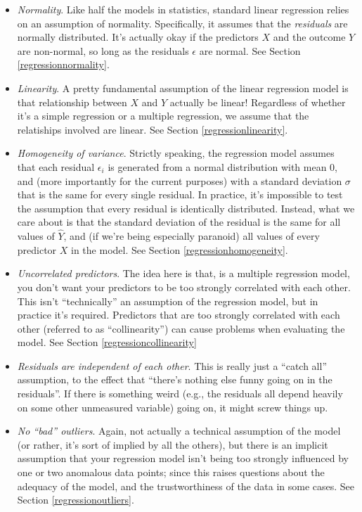 \documentclass[
]{book}
\providecommand{\tightlist}{%
  \setlength{\itemsep}{0pt}\setlength{\parskip}{0pt}}
\begin{document}
\begin{itemize}
\tightlist
\item
  \emph{Normality}. Like half the models in statistics, standard linear regression relies on an assumption of normality. Specifically, it assumes that the \emph{residuals} are normally distributed. It's actually okay if the predictors \(X\) and the outcome \(Y\) are non-normal, so long as the residuals \(\epsilon\) are normal. See Section \ref{regressionnormality}.
\item
  \emph{Linearity}. A pretty fundamental assumption of the linear regression model is that relationship between \(X\) and \(Y\) actually be linear! Regardless of whether it's a simple regression or a multiple regression, we assume that the relatiships involved are linear. See Section \ref{regressionlinearity}.
\item
  \emph{Homogeneity of variance}. Strictly speaking, the regression model assumes that each residual \(\epsilon_i\) is generated from a normal distribution with mean 0, and (more importantly for the current purposes) with a standard deviation \(\sigma\) that is the same for every single residual. In practice, it's impossible to test the assumption that every residual is identically distributed. Instead, what we care about is that the standard deviation of the residual is the same for all values of \(\hat{Y}\), and (if we're being especially paranoid) all values of every predictor \(X\) in the model. See Section \ref{regressionhomogeneity}.
\item
  \emph{Uncorrelated predictors}. The idea here is that, is a multiple regression model, you don't want your predictors to be too strongly correlated with each other. This isn't ``technically'' an assumption of the regression model, but in practice it's required. Predictors that are too strongly correlated with each other (referred to as ``collinearity'') can cause problems when evaluating the model. See Section \ref{regressioncollinearity}
\item
  \emph{Residuals are independent of each other}. This is really just a ``catch all'' assumption, to the effect that ``there's nothing else funny going on in the residuals''. If there is something weird (e.g., the residuals all depend heavily on some other unmeasured variable) going on, it might screw things up.
\item
  \emph{No ``bad'' outliers}. Again, not actually a technical assumption of the model (or rather, it's sort of implied by all the others), but there is an implicit assumption that your regression model isn't being too strongly influenced by one or two anomalous data points; since this raises questions about the adequacy of the model, and the trustworthiness of the data in some cases. See Section \ref{regressionoutliers}.
\end{itemize}
\end{document}
